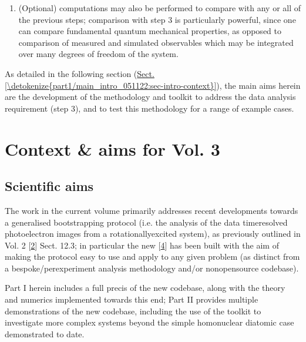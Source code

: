 \documentclass[letterpaper,table,10pt,english]{jupyterBook}
\begin{document}
\begin{enumerate}
\item {} 
\sphinxAtStartPar
(Optional)  computations may also be performed to compare with any or all of the previous steps; comparison with step 3 is particularly powerful, since one can compare fundamental quantum mechanical properties, as opposed to comparison of measured and simulated observables which may be integrated over many degrees of freedom of the system.

\end{enumerate}

\sphinxAtStartPar
As detailed in the following section (\hyperref[\detokenize{part1/main_intro_051122:sec-intro-context}]{Sect.\@ \ref{\detokenize{part1/main_intro_051122:sec-intro-context}}}), the main aims herein are the development of the methodology and toolkit to address the data analysis requirement (step 3), and to test this methodology for a range of example cases.


\section{Context \& aims for Vol. 3}
\label{\detokenize{part1/main_intro_051122:context-aims-for-vol-3}}\label{\detokenize{part1/main_intro_051122:sec-intro-context}}

\subsection{Scientific aims}
\label{\detokenize{part1/main_intro_051122:scientific-aims}}
\sphinxAtStartPar
The work in the current volume primarily addresses recent developments towards a generalised bootstrapping protocol (i.e. the analysis of the data time\sphinxhyphen{}resolved photoelectron images from a rotationally\sphinxhyphen{}excited system), as previously outlined in  Vol. 2 {[}\hyperlink{cite.backmatter/bibliography:id614}{2}{]} Sect. 12.3; in particular the new  {[}\hyperlink{cite.backmatter/bibliography:id618}{4}{]} has been built with the aim of making the protocol easy to use and apply to any given problem (as distinct from a bespoke/per\sphinxhyphen{}experiment analysis methodology and/or non\sphinxhyphen{}open\sphinxhyphen{}source codebase).

\sphinxAtStartPar
Part I herein includes a full precis of the new codebase, along with the theory and numerics implemented towards this end; Part II provides multiple demonstrations of the new codebase, including the use of the toolkit to investigate more complex systems beyond the simple homonuclear diatomic case demonstrated to date.
\end{document}
